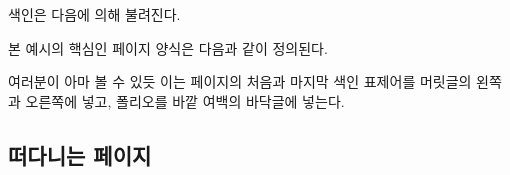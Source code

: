 색인은 다음에 의해 불려진다.
\begin{lcode}
\clearpage
\pagestyle{index}
\renewcommand{\preindexhook}{%
The first page number is usually, but not always, 
the primary reference to
the indexed topic.\vskip\onelineskip}
\printindex
\end{lcode}


본 예시의 핵심인  페이지 양식은 다음과 같이 정의된다.
\begin{lcode}
\end{lcode}
여러분이 아마 볼 수 있듯 이는 페이지의 처음과 마지막
색인 표제어를 머릿글의 왼쪽과 오른쪽에
넣고, 폴리오를 바깥 여백의
바닥글에 넣는다.


\subsection{떠다니는 페이지}


